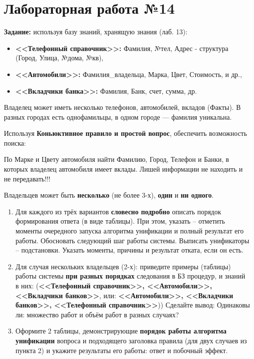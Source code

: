 \chapter{Лабораторная работа №14}

\textbf{Задание:} используя базу знаний, хранящую знания (лаб. 13):
\begin{itemize}
    \item \textbf{<<Телефонный справочник>>:} Фамилия, №тел, Адрес - структура (Город, Улица, №дома, №кв),
    \item \textbf{<<Автомобили>>:} Фамилия\_владельца, Марка, Цвет, Стоимость, и др.,
    \item \textbf{<<Вкладчики банка>>:} Фамилия, Банк, счет, сумма, др.
\end{itemize}

Владелец может иметь несколько телефонов, автомобилей, вкладов (Факты). В разных городах есть однофамильцы, в одном городе --- фамилия уникальна.

Используя \textbf{Коньюктивное правило и простой вопрос}, обеспечить возможность поиска:

По Марке и Цвету автомобиля найти Фамилию, Город, Телефон и Банки, в которых владелец автомобиля имеет вклады. Лишей информации не находить и не передавать!!!

Владельцев может быть \textbf{несколько} (не более 3-х), \textbf{один} и \textbf{ни одного}.

\begin{enumerate}
    \item Для каждого из трёх вариантов \textbf{словесно подробно} описать порядок формирования ответа (в виде таблицы). При этом, указать – отметить моменты очередного запуска алгоритма унификации и полный результат его работы. Обосновать следующий шаг работы системы. Выписать унификаторы – подстановки. Указать моменты, причины и результат отката, если он есть.
    \item Для случая нескольких владельцев (2-х): приведите примеры (таблицы) работы системы \textbf{при разных порядках} следования в БЗ процедур, и знаний в них: (\textbf{<<Телефонный справочник>>, <<Автомобили>>, <<Вкладчики банков>>}, или: \textbf{<<Автомобили>>, <<Вкладчики банков>>, <<Телефонный справочник>>})) Сделайте вывод: Одинаковы ли: множество работ и объём работ в разных случаях?
    \item Оформите 2 таблицы, демонстрирующие \textbf{порядок работы алгоритма унификации} вопроса и подходящего заголовка правила (для двух случаев из пункта 2) и укажите результаты его работы: ответ и побочный эффект.
\end{enumerate}

